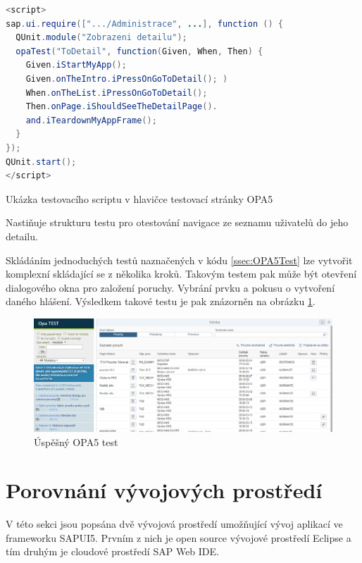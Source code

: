 \documentclass[thesis=M,czech]{FITthesis}[2012/06/26]
\begin{document}
\begin{algorithm}[H]
	\begin{lstlisting}[language=java]   
<script>
sap.ui.require([".../Administrace", ...], function () {
  QUnit.module("Zobrazeni detailu");
  opaTest("ToDetail", function(Given, When, Then) {
    Given.iStartMyApp();
    Given.onTheIntro.iPressOnGoToDetail(); )
    When.onTheList.iPressOnGoToDetail();
    Then.onPage.iShouldSeeTheDetailPage().
    and.iTeardownMyAppFrame();
  }
});
QUnit.start();
</script>
	\end{lstlisting}
	\caption{Ukázka testovacího scriptu v hlavičce testovací stránky OPA5}	
	\label{code:OPA5Test}
	\small Nastiňuje strukturu testu pro otestování navigace ze seznamu uživatelů do jeho detailu. 
\end{algorithm}
Skládáním jednoduchých testů naznačených v kódu \ref{ssec:OPA5Test} lze vytvořit komplexní skládající se z několika kroků. Takovým testem pak může být otevření dialogového okna pro založení poruchy. Vybrání prvku a pokusu o vytvoření daného hlášení. Výsledkem takové testu je pak znázorněn na obrázku \ref{img:opa5}.
\begin{figure}[H]
	\centering
	\includegraphics[width=1\textwidth]{images/opa5}
	\caption{Úspěšný OPA5 test}
	\label{img:opa5}
\end{figure}

\section{Porovnání vývojových prostředí}
V této sekci jsou popsána dvě vývojová prostředí umožňující vývoj aplikací ve frameworku SAPUI5. Prvním z nich je open source vývojové prostředí Eclipse a tím druhým je cloudové prostředí SAP Web IDE.  
\end{document}
